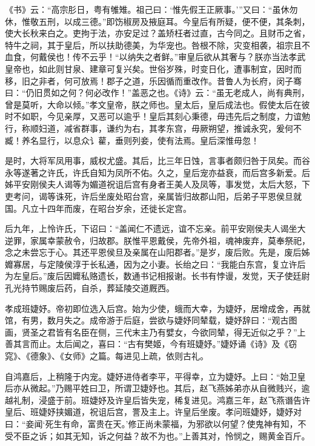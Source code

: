 \documentclass[12pt,UTF8]{ctexbook}
\begin{document}
《书》云：“高宗肜日，粤有雊雉。祖己曰：‘惟先假王正厥事。’”又曰：“虽休勿休，惟敬五刑，以成三德。”即饬椒房及掖庭耳。今皇后有所疑，便不便，其条刺，使大长秋来白之。吏拘于法，亦安足过？盖矫枉者过直，古今同之。且财币之省，特牛之祠，其于皇后，所以扶助德美，为华宠也。咎根不除，灾变相袭，祖宗且不血食，何戴侯也！传不云乎！“以纳失之者鲜。”审皇后欲从其奢与？朕亦当法孝武皇帝也，如此则甘泉、建章可复兴矣。世俗岁殊，时变日化，遭事制宜，因时而移，旧之非者，何可放焉！郡子之道，乐因循而重改作。昔鲁人为长府，闵子骞曰：“仍旧贯如之何？何必改作！”盖恶之也。《诗》云：“虽无老成人，尚有典刑，曾是莫听，大命以倾。”孝文皇帝，朕之师也。皇太后，皇后成法也。假使太后在彼时不如职，今见亲厚，又恶可以逾乎！皇后其刻心秉德，毋违先后之制度，力谊勉行，称顺妇道，减省群事，谦约为右，其孝东宫，毋厥朔望，推诚永究，爰何不臧！养名显行，以息众讠雚，垂则列妾，使有法焉。皇后深惟毋忽！



是时，大将军凤用事，威权尤盛。其后，比三年日蚀，言事者颇归咎于凤矣。而谷永等遂著之许氏，许氏自知为凤所不佑。久之，皇后宠亦益衰，而后宫多新爱。后姊平安刚侯夫人谒等为媚道祝诅后宫有身者王美人及凤等，事发觉，太后大怒，下吏考问，谒等诛死，许后坐废处昭台宫，亲属皆归故郡山阳，后弟子平恩侯旦就国。凡立十四年而废，在昭台岁余，还徙长定宫。



后九年，上怜许氏，下诏曰：“盖闻仁不遗远，谊不忘亲。前平安刚侯夫人谒坐大逆罪，家属幸蒙赦令，归故郡。朕惟平恩戴侯，先帝外祖，魂神废弃，莫奉祭祀，念之未尝忘于心。其还平恩侯旦及亲属在山阳郡者。”是岁，废后败。先是，废后姊孊寡居，与定陵侯淳于长私通，因为之小妻。长绐之曰：“我能白东宫，复立许后为左皇后。”废后因孊私赂遗长，数通书记相报谢。长书有悖谩，发觉，天子使廷尉孔光持节赐废后药，自杀，葬延陵交道厩西。



孝成班婕妤。帝初即位选入后宫。始为少使，蛾而大幸，为婕妤，居增成舍，再就馆，有男，数月失之。成帝游于后庭，尝欲与婕妤同辇载，婕妤辞曰：“观古图画，贤圣之君皆有名臣在侧，三代末主乃有嬖女，今欲同辇，得无近似之乎？”上善其言而止。太后闻之，喜曰：“古有樊姬，今有班婕妤。”婕妤诵《诗》及《窃窕》、《德象》、《女师》之篇。每进见上疏，依则古礼。



自鸿嘉后，上稍隆于内宠。婕妤进侍者李平，平得幸，立为婕妤。上曰：“始卫皇后亦从微起。”乃赐平姓曰卫，所谓卫婕妤也。其后，赵飞燕姊弟亦从自微贱兴，逾越礼制，浸盛于前。班婕妤及许皇后皆失宠，稀复进见。鸿嘉三年，赵飞燕谮告许皇后、班婕妤挟媚道，祝诅后宫，詈及主上。许皇后坐废。孝问班婕妤，婕妤对曰：“妾闻‘死生有命，富贵在天。’修正尚未蒙福，为邪欲以何望？使鬼神有知，不受不臣之诉；如其无知，诉之何益？故不为也。”上善其对，怜悯之，赐黄金百斤。
\end{document}
